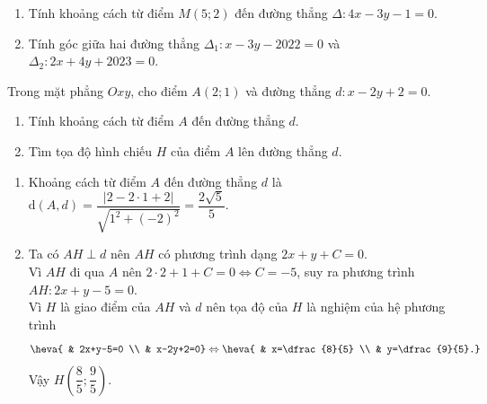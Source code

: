 \begin{bt}%
	\hfill
	\begin{enumerate}
		\item Tính khoảng cách từ điểm $M(5;2)$ đến đường thẳng $\Delta\colon 4x-3y-1=0$.
		\item Tính góc giữa hai đường thẳng $\Delta_1\colon x-3 y-2022=0$ và $\Delta_2\colon 2x+4y+2023=0$.
	\end{enumerate}
\end{bt}

\begin{bt}%
Trong mặt phẳng $Oxy$, cho điểm $A(2;1)$ và đường thẳng $d\colon x-2y+2=0$.
\begin{enumerate}
\item Tính khoảng cách từ điểm $A$ đến đường thẳng $d$.
\item Tìm tọa độ hình chiếu $H$ của điểm $A$ lên đường thẳng $d$.
\end{enumerate}
\loigiai
{
\begin{enumerate}
\item Khoảng cách từ điểm $A$ đến đường thẳng $d$ là $\mathrm{d}(A,d)=\dfrac{|2-2\cdot1+2|}{\sqrt{1^2+\left(-2\right)^2}}=\dfrac{2\sqrt{5}}{5}$.
\item Ta có $AH\perp d$ nên $AH$ có phương trình dạng $2x+y+C=0$. \\
Vì $AH$ đi qua $A$ nên $2\cdot2+1+C=0 \Leftrightarrow C=-5$, suy ra phương trình $AH\colon 2x+y-5=0$. \\
Vì $H$ là giao điểm của $AH$ và $d$ nên tọa độ của $H$ là nghiệm của hệ phương trình
$$\heva{ & 2x+y-5=0 \\ & x-2y+2=0} \Leftrightarrow \heva{ & x=\dfrac{8}{5} \\ & y=\dfrac{9}{5}.}$$
Vậy $H\left(\dfrac{8}{5};\dfrac{9}{5}\right)$.
\end{enumerate}
}
\end{bt}

